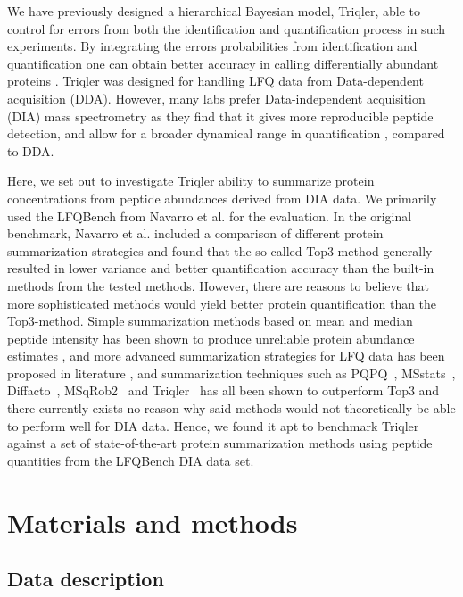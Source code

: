\documentclass[10pt,letterpaper]{article}
\begin{document}
We have previously designed a hierarchical Bayesian model, Triqler, able to control for errors from both the identification and quantification process in such experiments\cite{The2018Integrated}. By integrating the errors probabilities from identification and quantification one can obtain better accuracy in calling differentially abundant proteins \cite{The2018Integrated}. Triqler was designed for handling LFQ data from Data-dependent acquisition (DDA). However, many labs prefer Data-independent acquisition (DIA) mass spectrometry \cite{venable2004automated} as they find that it gives more reproducible peptide detection, and allow for a broader dynamical range in quantification \cite{bern2010deconvolution,zhang2020DIA}, compared to DDA. 

Here, we set out to investigate Triqler ability to summarize protein concentrations from peptide abundances derived from DIA data. We primarily used the LFQBench from Navarro et al. \cite{navarro2016multicenter} for the evaluation. In the original benchmark, Navarro et al. included a comparison of different protein summarization strategies and found that the so-called Top3 method generally resulted in lower variance and better quantification accuracy than the built-in methods from the tested methods\cite{navarro2016multicenter}. However, there are reasons to believe that more sophisticated methods would yield better protein quantification than the Top3-method. Simple summarization methods based on mean and median peptide intensity has been shown to produce unreliable protein abundance estimates \cite{goeminne2015summarization}, and more advanced summarization strategies for LFQ data has been proposed in literature \cite{silva2006absolute,cox2014accurate}, and summarization techniques such as PQPQ~\cite{forshed2011enhanced}, MSstats~\cite{choi2014msstats}, Diffacto~\cite{zhang2017covariation}, MSqRob2~\cite{sticker2020robust} and Triqler~\cite{The2018Integrated} has all been shown to outperform Top3 and there currently exists no reason why said methods would not theoretically be able to perform well for DIA data. Hence, we found it apt to benchmark Triqler against a set of state-of-the-art protein summarization methods using peptide quantities from the LFQBench DIA data set.
 
 
\section*{Materials and methods}


\subsection*{Data description}
\end{document}
